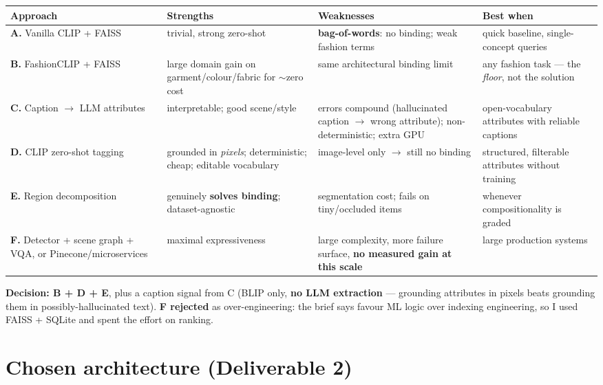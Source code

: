 \documentclass[10pt,a4paper]{article}
\begin{document}
\begin{center}\small
\begin{tabularx}{\textwidth}{@{}>{\raggedright\arraybackslash}p{}
                                >{\raggedright\arraybackslash}X
                                >{\raggedright\arraybackslash}X
                                >{\raggedright\arraybackslash}p{}@{}}
\toprule
\textbf{Approach} & \textbf{Strengths} & \textbf{Weaknesses} & \textbf{Best when} \\
\midrule
\textbf{A.} Vanilla CLIP + FAISS & trivial, strong zero-shot & \textbf{bag-of-words}: no binding; weak fashion terms & quick baseline, single-concept queries \\
\textbf{B.} FashionCLIP + FAISS & large domain gain on garment/colour/fabric for $\sim$zero cost & same architectural binding limit & any fashion task --- the \emph{floor}, not the solution \\
\textbf{C.} Caption $\rightarrow$ LLM attributes & interpretable; good scene/style & errors compound (hallucinated caption $\rightarrow$ wrong attribute); non-deterministic; extra GPU & open-vocabulary attributes with reliable captions \\
\textbf{D.} CLIP zero-shot tagging & grounded in \emph{pixels}; deterministic; cheap; editable vocabulary & image-level only $\rightarrow$ still no binding & structured, filterable attributes without training \\
\textbf{E.} Region decomposition & genuinely \textbf{solves binding}; dataset-agnostic & segmentation cost; fails on tiny/occluded items & whenever compositionality is graded \\
\textbf{F.} Detector + scene graph + VQA, or Pinecone/microservices & maximal expressiveness & large complexity, more failure surface, \textbf{no measured gain at this scale} & large production systems \\
\bottomrule
\end{tabularx}
\end{center}

\textbf{Decision: B + D + E}, plus a caption signal from C (BLIP only, \textbf{no LLM extraction}
--- grounding attributes in pixels beats grounding them in possibly-hallucinated text).
\textbf{F rejected} as over-engineering: the brief says favour ML logic over indexing engineering,
so I used FAISS + SQLite and spent the effort on ranking.

\section{Chosen architecture \textnormal{\small(Deliverable 2)}}
\end{document}
